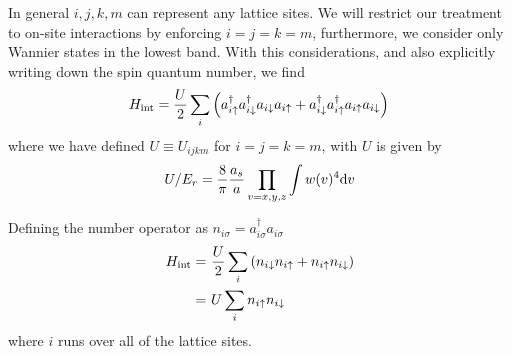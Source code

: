 In general $i,j,k,m$ can represent any lattice sites.  We will restrict
our treatment to on-site interactions by enforcing $i=j=k=m$,  furthermore, we
consider only Wannier states in the lowest band. 
With this considerations, and also explicitly writing down the spin quantum
number, we find 
\begin{equation}
   H_{\text{int}} =  
           \frac{U}{2}
        \sum_{i} 
         \left( 
           a_{i \uparrow }^{\dagger} a_{i \downarrow}^{\dagger} a_{i \downarrow} a_{i \uparrow } +
           a_{i \downarrow}^{\dagger} a_{i \uparrow }^{\dagger} a_{i \uparrow } a_{i \downarrow}
         \right)\\
\end{equation}
where we have defined $U\equiv U_{ijkm}$ for $i=j=k=m$, with $U$ is given by  
\begin{equation}
  U/E_{r} = \frac{ 8}{ \pi}  \frac{ a_{s} }{a}
   \prod_{v=x,y,z}  \int  w(v) ^{4} \mathrm{d}v  
\end{equation}

Defining the number operator as $n_{i\sigma} = a_{i\sigma}^{\dagger}
a_{i\sigma}$ 
\begin{equation}
\begin{split}
   H_{\text{int}}  
     = & \  
           \frac{U}{2}
         \sum_{i} \left( 
           n_{i\spdn} n_{i\spup} + 
           n_{i\spup} n_{i\spdn} \right) 
    \\
     = & \ 
           U\sum_{i}
           n_{i\spup} n_{i\spdn}  
\end{split}
\end{equation}
where $i$ runs over all of the lattice sites.  


